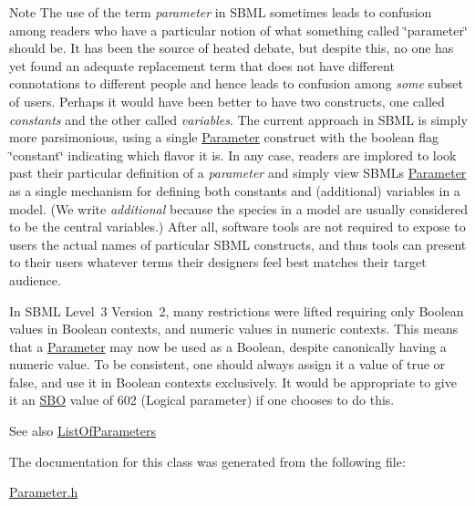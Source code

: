 \begin{DoxyNote}{Note}
The use of the term {\itshape parameter} in S\+B\+ML sometimes leads to confusion among readers who have a particular notion of what something called \char`\"{}parameter\char`\"{} should be. It has been the source of heated debate, but despite this, no one has yet found an adequate replacement term that does not have different connotations to different people and hence leads to confusion among {\itshape some} subset of users. Perhaps it would have been better to have two constructs, one called {\itshape constants} and the other called {\itshape variables}. The current approach in S\+B\+ML is simply more parsimonious, using a single \hyperlink{class_parameter}{Parameter} construct with the boolean flag \char`\"{}constant\char`\"{} indicating which flavor it is. In any case, readers are implored to look past their particular definition of a {\itshape parameter} and simply view S\+B\+ML\textquotesingle{}s \hyperlink{class_parameter}{Parameter} as a single mechanism for defining both constants and (additional) variables in a model. (We write {\itshape additional} because the species in a model are usually considered to be the central variables.) After all, software tools are not required to expose to users the actual names of particular S\+B\+ML constructs, and thus tools can present to their users whatever terms their designers feel best matches their target audience.
\end{DoxyNote}
In S\+B\+ML Level~3 Version~2, many restrictions were lifted requiring only Boolean values in Boolean contexts, and numeric values in numeric contexts. This means that a \hyperlink{class_parameter}{Parameter} may now be used as a Boolean, despite canonically having a numeric value. To be consistent, one should always assign it a value of {\ttfamily true} or {\ttfamily false}, and use it in Boolean contexts exclusively. It would be appropriate to give it an \hyperlink{class_s_b_o}{S\+BO} value of 602 (\textquotesingle{}Logical parameter\textquotesingle{}) if one chooses to do this.

\begin{DoxySeeAlso}{See also}
\hyperlink{class_list_of_parameters}{List\+Of\+Parameters} 
\end{DoxySeeAlso}


The documentation for this class was generated from the following file\+:\begin{DoxyCompactItemize}
\item 
\hyperlink{_parameter_8h}{Parameter.\+h}\end{DoxyCompactItemize}
